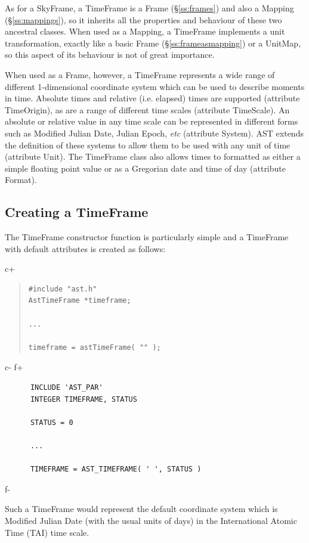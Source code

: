 \documentclass[twoside,11pt]{article}
\newcommand{\secref}[1]{\S\ref{#1}}
\newcommand{\secref}[1]{\ref{#1}}
\begin{document}
As for a SkyFrame, a TimeFrame is a Frame (\secref{ss:frames}) and also a
Mapping (\secref{ss:mappings}), so it inherits all the properties and
behaviour of these two ancestral classes.  When used as a Mapping, a
TimeFrame implements a unit transformation, exactly like a basic Frame
(\secref{ss:frameasmapping}) or a UnitMap, so this aspect of its
behaviour is not of great importance.

When used as a Frame, however, a TimeFrame represents a wide range of
different 1-dimensional coordinate system which can be used to describe
moments in time. Absolute times and relative (i.e. elapsed) times are
supported (attribute TimeOrigin), as are a range of different time scales
(attribute TimeScale). An absolute or relative value in any time scale can 
be represented in different forms such as Modified Julian Date, Julian Epoch, 
\emph{etc} (attribute System). AST extends the definition of these systems to
allow them to be used with any unit of time (attribute Unit). The TimeFrame 
class also allows times to formatted as either a simple floating point value 
or as a Gregorian date and time of day (attribute Format).

\subsection{Creating a TimeFrame}

The TimeFrame constructor function is particularly simple and a
TimeFrame with default attributes is created as follows:

c+
\begin{quote}
\small
\begin{verbatim}
#include "ast.h"
AstTimeFrame *timeframe;

...

timeframe = astTimeFrame( "" );
\end{verbatim}
\normalsize
\end{quote}
c-
f+
\small
\begin{verbatim}
      INCLUDE 'AST_PAR'
      INTEGER TIMEFRAME, STATUS

      STATUS = 0

      ...

      TIMEFRAME = AST_TIMEFRAME( ' ', STATUS )
\end{verbatim}
\normalsize
f-

Such a TimeFrame would represent the default coordinate system which is 
Modified Julian Date (with the usual units of days) in the International 
Atomic Time (TAI) time scale.
\end{document}
